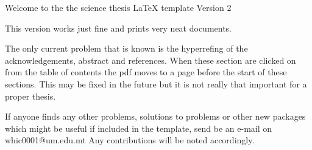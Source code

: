 Welcome to the the science thesis LaTeX template Version 2


This version works just fine and prints very neat documents.

The only current problem that is known is the hyperrefing of the acknowledgements, abstract and references. When these section are clicked on from the table of contents the pdf moves to a page before the start of these sections. This may be fixed in the future but it is not really that important for a proper thesis.

If anyone finds any other problems, solutions to problems or other new packages which might be useful if included in the template, send be an e-mail on whic0001@um.edu.mt Any contributions will be noted accordingly.

